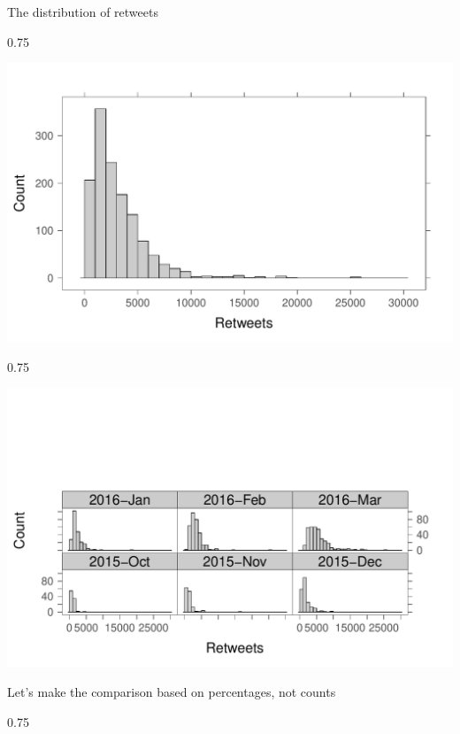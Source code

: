 \documentclass{beamer}\usepackage[]{graphicx}\usepackage[]{color}
\newenvironment{knitrout}{}{} %
\renewenvironment{knitrout}{\begin{spacing}{0.75}\begin{tiny}}{\end{tiny}\end{spacing}}
\begin{document}
\begin{frame}{The distribution of retweets\;\;}
\begin{knitrout}\small
{}\color{fgcolor}

{\centering \includegraphics[width=0.89\linewidth]{figure/graphics-unnamed-chunk-5-1} 

}



\end{knitrout}

\newpage
\begin{knitrout}\small
{}\color{fgcolor}

{\centering \includegraphics[width=1\linewidth]{figure/graphics-unnamed-chunk-6-1} 

}



\end{knitrout}

\newpage
Let's make the comparison based on percentages, not counts
\begin{knitrout}\small
{}\color{fgcolor}


\end{knitrout}
\end{frame}
\end{document}
